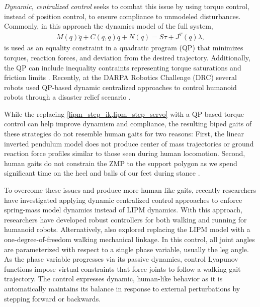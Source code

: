 \emph{Dynamic, centralized control} seeks to combat this issue by using torque
control, instead of position control, to ensure compliance to unmodeled
disturbances. Commonly, in this approach the dynamics model of the full
system,
\begin{align}
    M(q) \ddot{q} + C(q, \dot{q}) \dot{q} + N(q) = S\tau + J^T(q) \lambda,
\end{align}
is used as an equality constraint in a quadratic program (QP) that minimizes
torques, reaction forces, and deviation from the desired trajectory.
Additionally, the QP can include inequality contraints representing torque
saturations and friction limits \citep{hutter2013hybrid, herzog2014balancing,
saab2013dynamic, wensing2013generation}. Recently, at the DARPA Robotics
Challenge (DRC) several robots used QP-based dynamic centralized approaches to
control humanoid robots through a disaster relief scenario
\citep{feng2015optimization, kuindersma2014efficiently,
englsberger2014trajectory}. 

While the replacing \cref{lipm_step_ik,lipm_step_servo} with a QP-based torque
control can help improve dynamism and compliance, the resulting biped gaits of
these strategies do not resemble human gaits for two reasons: First, the linear
inverted pendulum model does not produce center of mass trajectories or ground
reaction force profiles similar to those seen during human locomotion.  Second,
human gaits do not constrain the ZMP to the support polygon as we spend
significant time on the heel and balls of our feet during stance
\citep{perry1992gait}.

To overcome these issues and produce more human like gaits, recently researchers
have investigated applying dynamic centralized control approaches to enforce
spring-mass model dynamics instead of LIPM dynamics. With this approach,
researchers have developed robust controllers for both walking
\citep{wensing2013generation} and running \citep{martin2015robust} for humanoid
robots. Alternatively, \citet{sreenath2011compliant} also explored replacing the
LIPM model with a one-degree-of-freedom walking mechanical linkage. In this
control, all joint angles are parameterized with respect to a single phase
variable, usually the leg angle. As the phase variable progresses via its
passive dynamics, control Lyapunov functions impose virtual constraints that
force joints to follow a walking gait trajectory. The control expresses dynamic,
human-like behavior as it is automatically maintains its balance in response to
external perturbations by stepping forward or backwards.


